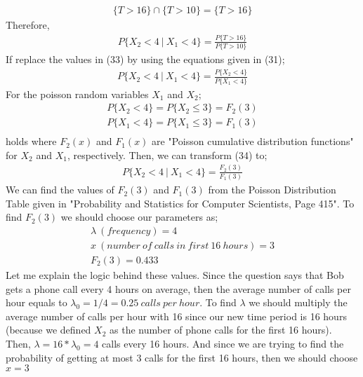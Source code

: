 \documentclass[12pt]{article}
\begin{document}
\begin{equation*} 
\begin{split}
\{T>16\} \cap \{T>10\} = \{T>16\}
\end{split}
\end{equation*}
Therefore,
\begin{equation} 
\begin{split}
P\{X_{2} < 4 \ |\ X_{1} < 4\} = \frac{ P\{T>16\}}{P\{T>10\}} 
\end{split}
\end{equation}
If replace the values in (33) by using the equations given in (31);
\begin{equation} 
\begin{split}
P\{X_{2} < 4 \ |\ X_{1} < 4\} = \frac{ P\{X_{2} < 4\}}{P\{X_{1} < 4\}} 
\end{split}
\end{equation}
For the poisson random variables $X_{1}$ and $X_{2}$;
\begin{equation*} 
\begin{split}
P\{X_{2} < 4\} = P\{X_{2} \leq 3\} = F_{2}(3) \\
P\{X_{1} < 4\} = P\{X_{1} \leq 3\} = F_{1}(3) \\
\end{split}
\end{equation*}
holds where $F_{2}(x)$ and $F_{1}(x)$ are "Poisson cumulative distribution functions" for $X_{2}$ and $X_{1}$, respectively. Then, we can transform (34) to;
\begin{equation} 
\begin{split}
P\{X_{2} < 4 \ |\ X_{1} < 4\} = \frac{ F_{2}(3)}{F_{1}(3)} 
\end{split}
\end{equation}
We can find the values of $F_{2}(3)$ and $F_{1}(3)$ from the Poisson Distribution Table given in "Probability and Statistics for Computer Scientists, Page 415". To find $F_{2}(3)$ we should choose our parameters as;
\begin{equation*} 
\begin{split}
\lambda \ (frequency) = 4 \\
x \ (number\ of\ calls\ in\ first\ 16\ hours ) = 3 \\
F_{2}(3) = 0.433
\end{split}
\end{equation*}
Let me explain the logic behind these values. Since the question says that Bob gets a phone call every 4 hours on average, then the average number of calls per hour equals to $\lambda_{0} = 1/4 = 0.25\ calls\ per\ hour$. To find $\lambda$ we should multiply the average number of calls per hour with 16 since our new time period is 16 hours (because we defined $X_{2}$ as the number of phone calls for the first 16 hours). Then, $\lambda = 16*\lambda_{0} = 4$ calls every 16 hours. And since we are trying to find the probability of getting at most 3 calls for the first 16 hours, then we should choose $x=3$ \\ \\
\end{document}
